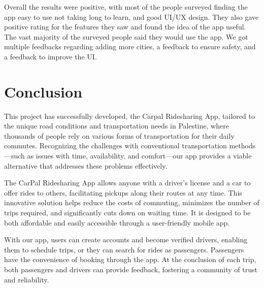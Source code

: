 \documentclass[a4paper, 12pt]{report} %
\begin{document}

                Overall the results were positive, with most of the people surveyed finding the app easy to use not taking long to learn, and good UI/UX design. They also gave positive rating for the features they saw and found the idea of the app useful. The vast majority of the surveyed people said they would use the app. We got multiple feedbacks regarding adding more cities, a feedback to ensure safety, and a feedback to improve the UI.


    \pagebreak
    \section{Conclusion}
        This project has successfully developed, the Carpal Ridesharing App, tailored to the unique road conditions and transportation needs in Palestine, where thousands of people rely on various forms of transportation for their daily commutes. Recognizing the challenges with conventional transportation methods—such as issues with time, availability, and comfort—our app provides a viable alternative that addresses these problems effectively.

        The CarPal Ridesharing App allows anyone with a driver's license and a car to offer rides to others, facilitating pickups along their routes at any time. This innovative solution helps reduce the costs of commuting, minimizes the number of trips required, and significantly cuts down on waiting time. It is designed to be both affordable and easily accessible through a user-friendly mobile app.

        With our app, users can create accounts and become verified drivers, enabling them to schedule trips, or they can search for rides as passengers. Passengers have the convenience of booking through the app. At the conclusion of each trip, both passengers and drivers can provide feedback, fostering a community of trust and reliability.
\end{document}
